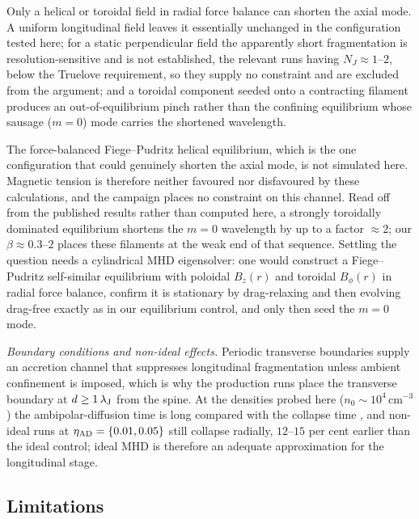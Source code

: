 \documentclass[usenatbib,twoside,twocolumn]{mnras}
\begin{document}
Only a helical or toroidal field in radial force balance can shorten the axial mode. A uniform longitudinal field leaves it essentially unchanged in the configuration tested here; for a static perpendicular field the apparently short fragmentation is resolution-sensitive and is not established, the relevant runs having $N_J\approx1$--$2$, below the Truelove requirement, so they supply no constraint and are excluded from the argument; and a toroidal component seeded onto a contracting filament produces an out-of-equilibrium pinch rather than the confining equilibrium whose sausage ($m=0$) mode carries the shortened wavelength.

The force-balanced Fiege--Pudritz helical equilibrium, which is the one configuration that could genuinely shorten the axial mode, is not simulated here. Magnetic tension is therefore neither favoured nor disfavoured by these calculations, and the campaign places no constraint on this channel. Read off from the published \citet{Fiege2000} results rather than computed here, a strongly toroidally dominated equilibrium shortens the $m=0$ wavelength by up to a factor $\approx2$; our $\beta\approx0.3$--$2$ places these filaments at the weak end of that sequence. Settling the question needs a cylindrical MHD eigensolver: one would construct a Fiege--Pudritz self-similar equilibrium with poloidal $B_z(r)$ and toroidal $B_\phi(r)$ in radial force balance, confirm it is stationary by drag-relaxing and then evolving drag-free exactly as in our equilibrium control, and only then seed the $m=0$ mode.

\emph{Boundary conditions and non-ideal effects.} Periodic transverse boundaries supply an accretion channel that suppresses longitudinal fragmentation unless ambient confinement is imposed, which is why the production runs place the transverse boundary at $d\geq1\,\lambda_{\rm J}$ from the spine. At the densities probed here ($n_0\sim10^4$\,cm$^{-3}$) the ambipolar-diffusion time is long compared with the collapse time \citep{Tassis2004}, and non-ideal runs at $\eta_{\rm AD}=\{0.01,0.05\}$ still collapse radially, $12$--$15$ per cent earlier than the ideal control; ideal MHD is therefore an adequate approximation for the longitudinal stage.



\subsection{Limitations}
\label{sec:limitations}
\end{document}
